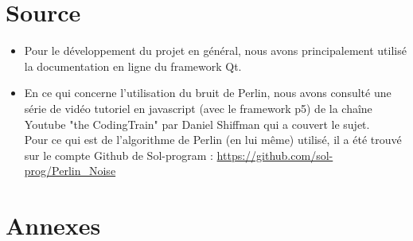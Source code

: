 \documentclass[a4paper,10pt,openany,oneside]{report}
\begin{document}
\chapter{Source}
\begin{itemize}
\item Pour le développement du projet en général, nous avons principalement utilisé la documentation en ligne du framework Qt.
\item En ce qui concerne l'utilisation du bruit de Perlin, nous avons consulté une série de vidéo tutoriel en javascript (avec le framework p5) de la chaîne Youtube "the CodingTrain" par Daniel Shiffman qui a couvert le sujet. \\
Pour ce qui est de l'algorithme de Perlin (en lui même) utilisé, il a été trouvé sur le compte Github de Sol-program :
\url{https://github.com/sol-prog/Perlin_Noise}
\end{itemize}

\chapter{Annexes}
\thispagestyle{headings}
\end{document}
